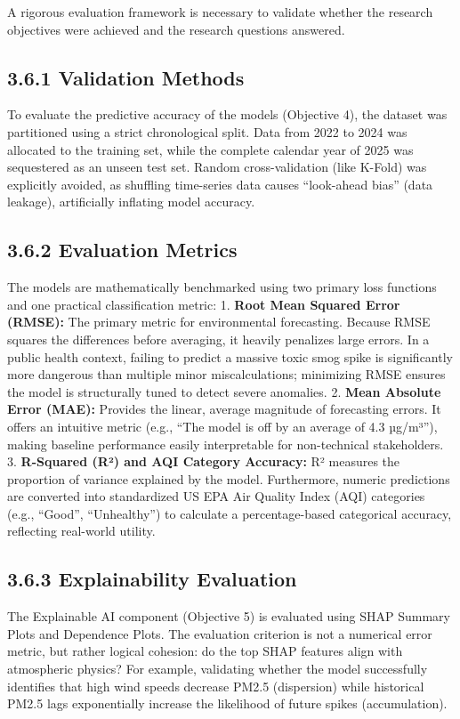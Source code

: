 A rigorous evaluation framework is necessary to validate whether the
research objectives were achieved and the research questions answered.

\subsection{3.6.1 Validation Methods}\label{validation-methods}

To evaluate the predictive accuracy of the models (Objective 4), the
dataset was partitioned using a strict chronological split. Data from
2022 to 2024 was allocated to the training set, while the complete
calendar year of 2025 was sequestered as an unseen test set. Random
cross-validation (like K-Fold) was explicitly avoided, as shuffling
time-series data causes ``look-ahead bias'' (data leakage), artificially
inflating model accuracy.

\subsection{3.6.2 Evaluation Metrics}\label{evaluation-metrics}

The models are mathematically benchmarked using two primary loss
functions and one practical classification metric: 1. \textbf{Root Mean
Squared Error (RMSE):} The primary metric for environmental forecasting.
Because RMSE squares the differences before averaging, it heavily
penalizes large errors. In a public health context, failing to predict a
massive toxic smog spike is significantly more dangerous than multiple
minor miscalculations; minimizing RMSE ensures the model is structurally
tuned to detect severe anomalies. 2. \textbf{Mean Absolute Error (MAE):}
Provides the linear, average magnitude of forecasting errors. It offers
an intuitive metric (e.g., ``The model is off by an average of 4.3
µg/m³''), making baseline performance easily interpretable for
non-technical stakeholders. 3. \textbf{R-Squared (R²) and AQI Category
Accuracy:} R² measures the proportion of variance explained by the
model. Furthermore, numeric predictions are converted into standardized
US EPA Air Quality Index (AQI) categories (e.g., ``Good'',
``Unhealthy'') to calculate a percentage-based categorical accuracy,
reflecting real-world utility.

\subsection{3.6.3 Explainability
Evaluation}\label{explainability-evaluation}

The Explainable AI component (Objective 5) is evaluated using SHAP
Summary Plots and Dependence Plots. The evaluation criterion is not a
numerical error metric, but rather logical cohesion: do the top SHAP
features align with atmospheric physics? For example, validating whether
the model successfully identifies that high wind speeds decrease PM2.5
(dispersion) while historical PM2.5 lags exponentially increase the
likelihood of future spikes (accumulation).
